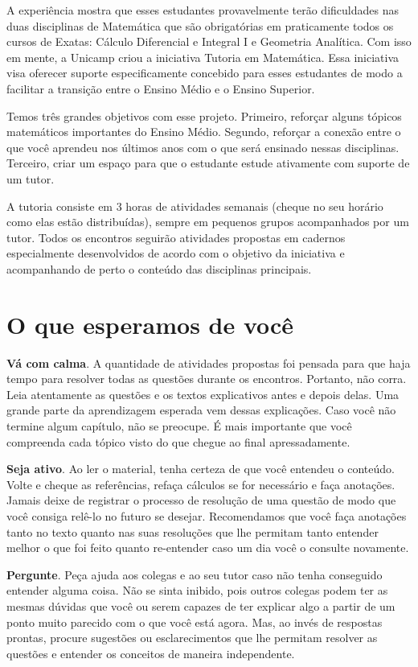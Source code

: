 A experiência mostra que esses estudantes provavelmente terão dificuldades nas duas disciplinas de Matemática que são obrigatórias em praticamente todos os cursos de Exatas: Cálculo Diferencial e Integral I e Geometria Analítica. Com isso em mente, a Unicamp criou a iniciativa Tutoria em Matemática. Essa iniciativa visa oferecer suporte especificamente concebido para esses estudantes de modo a facilitar a transição entre o Ensino Médio e o Ensino Superior.

Temos três grandes objetivos com esse projeto. Primeiro, reforçar alguns tópicos matemáticos importantes do Ensino Médio. Segundo, reforçar a conexão entre o que você aprendeu nos últimos anos com o que será ensinado nessas disciplinas. Terceiro, criar um espaço para que o estudante estude ativamente com suporte de um tutor.

A tutoria consiste em 3 horas de atividades semanais (cheque no seu horário como elas estão distribuídas), sempre em pequenos grupos acompanhados por um tutor. Todos os encontros seguirão atividades propostas em cadernos especialmente desenvolvidos de acordo com o objetivo da iniciativa e acompanhando de perto o conteúdo das disciplinas principais.

\section{O que esperamos de você}

\textbf{Vá com calma}. A quantidade de atividades propostas foi pensada para que haja tempo para resolver todas as questões durante os encontros. Portanto, não corra. Leia atentamente as questões e os textos explicativos antes e depois delas. Uma grande parte da aprendizagem esperada vem dessas explicações. Caso você não termine algum capítulo, não se preocupe. É mais importante que você compreenda cada tópico visto do que chegue ao final apressadamente.
 
\textbf{Seja ativo}. Ao ler o material, tenha certeza de que você entendeu o conteúdo. Volte e cheque as referências, refaça cálculos se for necessário e faça anotações. Jamais deixe de registrar o processo de resolução de uma questão de modo que você consiga relê-lo no futuro se desejar. Recomendamos que você faça anotações tanto no texto quanto nas suas resoluções que lhe permitam tanto entender  melhor o que foi feito quanto re-entender caso um dia você o consulte novamente. 

\textbf{Pergunte}. Peça ajuda aos colegas e ao seu tutor caso não tenha conseguido entender alguma coisa. Não se sinta inibido, pois outros colegas podem ter as mesmas dúvidas que você ou serem capazes de ter explicar algo a partir de um ponto muito parecido com o que você está agora. Mas, ao invés de respostas prontas, procure sugestões ou esclarecimentos que lhe permitam resolver as questões e entender os conceitos de maneira independente.

